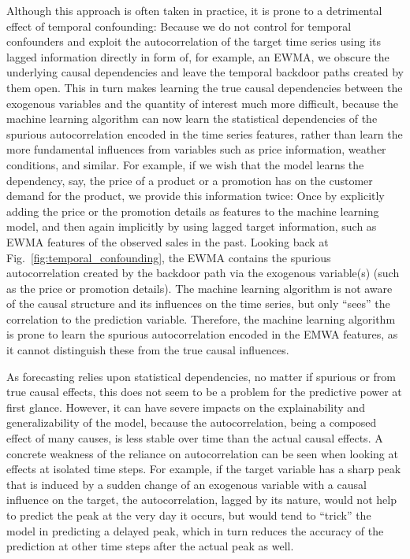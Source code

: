 \documentclass[BCOR=1mm, DIV=calc,10pt,
twoside=true,
twocolumn,
headings=normal]{scrartcl}
\newcommand{\fig}{Fig.~}
\begin{document}
Although this approach is often taken in practice, it is prone to a detrimental effect of temporal confounding: Because we do not control for temporal confounders and exploit the autocorrelation of the target time series using its lagged information directly in form of, for example, an EWMA, we obscure the underlying causal dependencies and leave the temporal backdoor paths created by them open. This in turn makes learning the true causal dependencies between the exogenous variables and the quantity of interest much more difficult, because the machine learning algorithm can now learn the statistical dependencies of the spurious autocorrelation encoded in the time series features, rather than learn the more fundamental influences from variables such as price information, weather conditions, and similar. For example, if we wish that the model learns the dependency, say, the price of a product or a promotion has on the customer demand for the product, we provide this information twice: Once by explicitly adding the price or the promotion details as features to the machine learning model, and then again implicitly by using lagged target information, such as EWMA features of the observed sales in the past. Looking back at \fig \ref{fig:temporal_confounding}, the EWMA contains the spurious autocorrelation created by the backdoor path via the exogenous variable(s) (such as the price or promotion details). The machine learning algorithm is not aware of the causal structure and its influences on the time series, but only ``sees'' the correlation to the prediction variable. Therefore, the machine learning algorithm is prone to learn the spurious autocorrelation encoded in the EMWA features, as it cannot distinguish these from the true causal influences.

As forecasting relies upon statistical dependencies, no matter if spurious or from true causal effects, this does not seem to be a problem for the predictive power at first glance. However, it can have severe impacts on the explainability and generalizability of the model, because the autocorrelation, being a composed effect of many causes, is less stable over time than the actual causal effects. A concrete weakness of the reliance on autocorrelation can be seen when looking at effects at isolated time steps. For example, if the target variable has a sharp peak that is induced by a sudden change of an exogenous variable with a causal influence on the target, the autocorrelation, lagged by its nature, would not help to predict the peak at the very day it occurs, but would tend to ``trick'' the model in predicting a delayed peak, which in turn reduces the accuracy of the prediction at other time steps after the actual peak as well.
\end{document}
